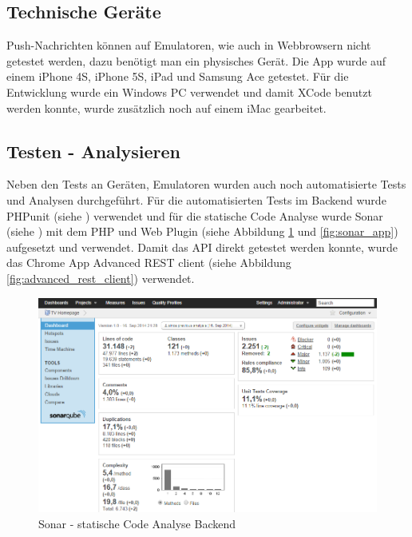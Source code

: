 \subsection{Technische Geräte}
Push-Nachrichten können auf Emulatoren, wie auch in Webbrowsern nicht getestet werden, dazu benötigt man ein physisches Gerät. Die App wurde auf einem iPhone 4S, iPhone 5S, iPad und Samsung Ace getestet. Für die Entwicklung wurde ein Windows PC verwendet und damit XCode benutzt werden konnte, wurde zusätzlich noch auf einem iMac gearbeitet.

\newpage
\subsection{Testen - Analysieren}
Neben den Tests an Geräten, Emulatoren wurden auch noch automatisierte Tests und Analysen durchgeführt. Für die automatisierten Tests im Backend wurde PHPunit (siehe \cite{phpunit}) verwendet und für die statische Code Analyse wurde Sonar (siehe \cite{sonar}) mit dem PHP und Web Plugin (siehe Abbildung \ref{fig:sonar_backend} und \ref{fig:sonar_app}) aufgesetzt und verwendet. Damit das API direkt getestet werden konnte, wurde das Chrome App Advanced REST client (siehe Abbildung \ref{fig:advanced_rest_client}) verwendet.

\begin{figure}[h]
\centering
\includegraphics[scale=0.5]{images/sonar_backend.png}
\caption{Sonar - statische Code Analyse Backend}
\label{fig:sonar_backend}
\end{figure}

